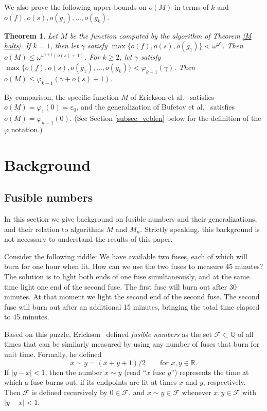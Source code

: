 \documentclass{article}
\newtheorem{Theorem}{Theorem}[section]
\theoremstyle{definition}
\newcommand{\Q}{\mathbb Q}
\newcommand{\R}{\mathbb R}
\newcommand{\ff}{\mathcal F}
\newcommand{\fuse}{\sim}
\begin{document}
    We also prove the following upper bounds on $o(M)$ in terms of $k$ and $o(f), o(s), o(g_1),\ldots, o(g_k)$.

    \begin{Theorem}\label{thm_o_bound}
        Let $M$ be the function computed by the algorithm of Theorem \ref{M halts}. If $k=1$, then let $\gamma$ satisfy $\max{\{o(f), o(s), o(g_1)\}} < \omega^{\omega^\gamma}$. Then $o(M)\le \omega^{\omega^{\gamma+1}(o(s)+1)}$. For $k\ge 2$, let $\gamma$ satisfy
        $\max\{o(f), o(s), o(g_1), \ldots,\allowbreak o(g_k)\} < \varphi_{k-1}(\gamma)$. Then $o(M)\le\varphi_{k-1}(\gamma+o(s)+1)$.
    \end{Theorem}

    By comparison, the specific function $M$ of Erickson et al.~\cite{ENX} satisfies $o(M)=\varphi_1(0)=\varepsilon_0$, and the generalization of Bufetov et al.~\cite{BNP} satisfies $o(M)=\varphi_{n-1}(0)$. (See Section \ref{subsec_veblen} below for the definition of the $\varphi$ notation.) 

\section{Background}

\subsection{Fusible numbers}\label{subsec_fusible}
In this section we give background on fusible numbers and their generalizations, and their relation to algorithms $M$ and $M_n$. Strictly speaking, this background is not necessary to understand the results of this paper.

Consider the following riddle: We have available two fuses, each of which
will burn for one hour when lit. How can we use the two fuses to measure 45 minutes? The solution is to light both ends of one fuse simultaneously, and at the same time light
one end of the second fuse. The first fuse will burn out after 30 minutes. At that moment we
light the second end of the second fuse. The second fuse will burn out after an additional 15
minutes, bringing the total time elapsed to 45 minutes.

Based on this puzzle, Erickson~\cite{Eri} defined \emph{fusible numbers} as the set $\ff\subset\Q$ of all times that can be similarly measured by using any number of fuses that burn for unit time. Formally, he defined 
\begin{equation*}
x\fuse y=(x+y+1)/2\qquad\text{for $x,y\in \R$.}
\end{equation*}
If $|y-x|<1$,  then the number $x\fuse y$ (read ``$x$ fuse $y$'') represents the time at which a fuse burns out, if its endpoints are lit at times $x$ and $y$, respectively. Then $\ff$ is defined recursively by $0\in\ff$, and $x\fuse y\in\ff$ whenever $x,y\in\ff$ with $|y-x|<1$.
\end{document}
